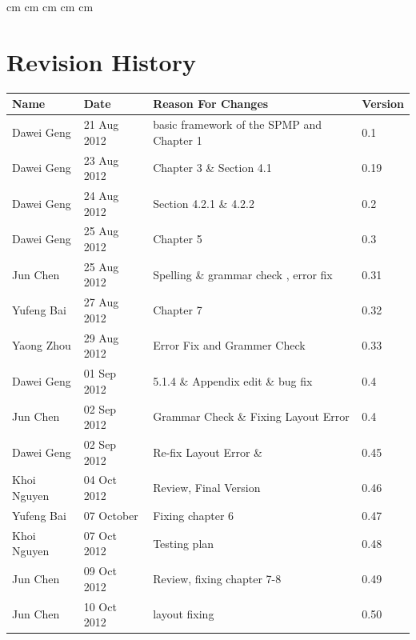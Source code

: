\documentclass[11pt, a4paper]{report}
\begin{document}
 cm
 cm
 cm
 cm
 cm

\tableofcontents






\clearpage
\section*{Revision History}
\begin{tabular}{| l | l | l | l | }
\hline
Name      		&	Date        	&	Reason For Changes								&	Version			\\ \hline
Dawei Geng      &	21 Aug 2012    	&	basic framework of the SPMP and Chapter 1		&	0.1				\\ \hline
Dawei Geng      &	23 Aug 2012    	&	Chapter 3 \& Section 4.1						&	0.19			\\ \hline
Dawei Geng      &	24 Aug 2012     &	Section 4.2.1 \& 4.2.2							&	0.2				\\ \hline
Dawei Geng     	&	25 Aug 2012     &	Chapter 5										&	0.3				\\ \hline
Jun Chen		&	25 Aug 2012		&	Spelling \& grammar check , error fix			&	0.31			\\ \hline
Yufeng Bai      &	27 Aug 2012		&	Chapter 7										&	0.32			\\ \hline
Yaong Zhou		&	29 Aug 2012		&	Error Fix and Grammer Check						&	0.33			\\ \hline
Dawei Geng      &	01 Sep 2012     &	5.1.4 \& Appendix edit \& bug fix				&	0.4				\\ \hline
Jun Chen     	&	02 Sep 2012     &   Grammar Check \& Fixing Layout Error			&	0.4				\\ \hline
Dawei Geng     	&	02 Sep 2012     &	Re-fix Layout Error	\&  						&	0.45			\\ \hline
Khoi Nguyen		&	04 Oct 2012		&	Review, Final Version							&	0.46	\\ \hline
Yufeng Bai	&	07 October	&	Fixing chapter 6									&	0.47\\ \hline
Khoi Nguyen     &	07 Oct 2012    	&	Testing plan									&	0.48			\\ \hline
Jun Chen     		&	09 Oct 2012         	&Review, fixing chapter 7-8									&	0.49			\\ \hline
Jun Chen     		&	10 Oct 2012         	&layout fixing									&	0.50			\\ \hline





\end{tabular}
\clearpage
\end{document}
